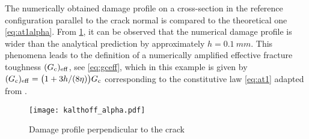 The numerically obtained damage profile on a cross-section in the reference configuration parallel to the crack normal is compared to the theoretical one \eqref{eq:at1alpha}. From \cref{fig:damageprofile}, it can be observed that the numerical damage profile is wider than the analytical prediction by approximately $h=\SI{0.1}{mm}$. This phenomena leads to the definition of a numerically amplified effective fracture toughness $(G_\mathrm{c})_\mathrm{eff}$, see \eqref{eq:gceff}, which in this example is given by $(G_\mathrm{c})_\mathrm{eff}=\bigl(1+3h/(8\eta)\bigr)G_\mathrm{c}$ corresponding to the constitutive law \eqref{eq:at1} adapted from \cite{HossainHsuehBourdinBhattachary:2014}.
\begin{figure}[htbp]
\centering
\texttt{[image: kalthoff\_alpha.pdf]}
\caption{Damage profile perpendicular to the crack} \label{fig:damageprofile}
\end{figure}

